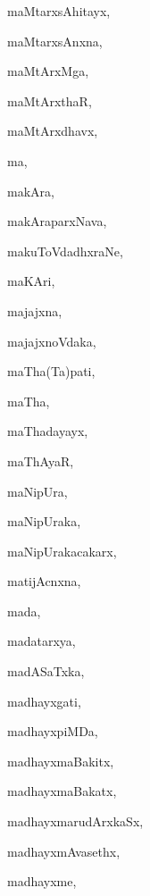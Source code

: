 \begin{multicols}{3}
{\noindent
{maMtarxsAhitayx}, \pageref{maMtarxsAhitayx}

\noindent
{maMtarxsAnxna}, \pageref{maMtarxsAnxna}

\noindent
{maMtArxMga}, \pageref{maMtArxMga}

\noindent
{maMtArxthaR}, \pageref{maMtArxthaR}

\noindent
{maMtArxdhavx}, \pageref{maMtArxdhavx}

\noindent
{ma}, \pageref{ma}

\noindent
{makAra}, \pageref{makAra}

\noindent
{makAraparxNava}, \pageref{makAraparxNava}

\noindent
{makuToVdadhxraNe}, \pageref{makuToVdadhxraNe}

\noindent
{maKAri}, \pageref{maKAri}

\noindent
{majajxna}, \pageref{majajxna}

\noindent
{majajxnoVdaka}, \pageref{majajxnoVdaka}

\noindent
{maTha(Ta)pati}, \pageref{maThaTapati}

\noindent
{maTha}, \pageref{maTha}

\noindent
{maThadayayx}, \pageref{maThadayayx}

\noindent
{maThAyaR}, \pageref{maThAyaR}

\noindent
{maNipUra}, \pageref{maNipUra}

\noindent
{maNipUraka}, \pageref{maNipUraka}

\noindent
{maNipUrakacakarx}, \pageref{maNipUrakacakarx}

\noindent
{matijAcnxna}, \pageref{matijAcnxna}

\noindent
{mada}, \pageref{mada}

\noindent
{madatarxya}, \pageref{madatarxya}

\noindent
{madASaTxka}, \pageref{madASaTxka}

\noindent
{madhayxgati}, \pageref{madhayxgati}

\noindent
{madhayxpiMDa}, \pageref{madhayxpiMDa}

\noindent
{madhayxmaBakitx}, \pageref{madhayxmaBakitx}

\noindent
{madhayxmaBakatx}, \pageref{madhayxmaBakatx}

\noindent
{madhayxmarudArxkaSx}, \pageref{madhayxmarudArxkaSx}

\noindent
{madhayxmAvasethx}, \pageref{madhayxmAvasethx}

\noindent
{madhayxme}, \pageref{madhayxme}

}
\end{multicols}
